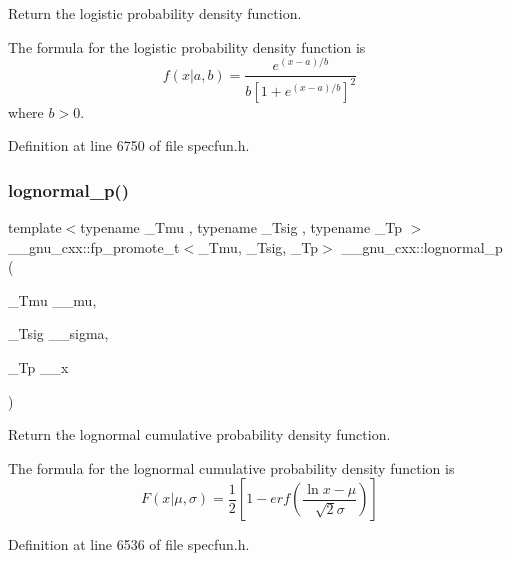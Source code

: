 Return the logistic probability density function. 

The formula for the logistic probability density function is \[ f(x| a, b) = \frac{e^{(x - a)/b}}{b[1 + e^{(x - a)/b}]^2} \] where $b > 0$. 

Definition at line 6750 of file specfun.\+h.

\mbox{\label{group__gnu__math__spec__func_ga3bbd4feb10f2d745bf8aca8748099c53}} 
\subsubsection{\texorpdfstring{lognormal\+\_\+p()}{lognormal\_p()}}
{\footnotesize\ttfamily template$<$typename \+\_\+\+Tmu , typename \+\_\+\+Tsig , typename \+\_\+\+Tp $>$ \\
\+\_\+\+\_\+gnu\+\_\+cxx\+::fp\+\_\+promote\+\_\+t$<$\+\_\+\+Tmu, \+\_\+\+Tsig, \+\_\+\+Tp$>$ \+\_\+\+\_\+gnu\+\_\+cxx\+::lognormal\+\_\+p (\begin{DoxyParamCaption}\item[{\+\_\+\+Tmu}]{\+\_\+\+\_\+mu,  }\item[{\+\_\+\+Tsig}]{\+\_\+\+\_\+sigma,  }\item[{\+\_\+\+Tp}]{\+\_\+\+\_\+x }\end{DoxyParamCaption})\hspace{0.3cm}{\ttfamily [inline]}}



Return the lognormal cumulative probability density function. 

The formula for the lognormal cumulative probability density function is \[ F(x|\mu,\sigma) = \frac{1}{2}\left[ 1-erf(\frac{\ln{x}-\mu}{\sqrt{2}\sigma}) \right] \] 

Definition at line 6536 of file specfun.\+h.

\mbox{\label{group__gnu__math__spec__func_gaef4db41e58e53144df2ddcc834d88e0b}} 

